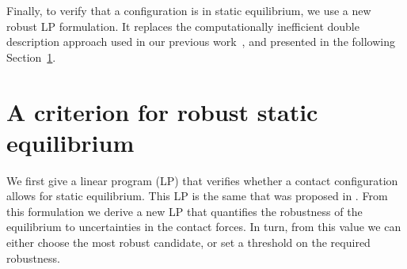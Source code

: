 \documentclass[journal]{IEEEtran}
\providecommand{\DIFaddtex}[1]{#1} %
\providecommand{\DIFaddbegin}{\protect\color{blue}} %
\providecommand{\DIFaddend}{\protect\color{black}} %
\providecommand{\DIFadd}[1]{\texorpdfstring{\DIFaddtex{#1}}{#1}} %
\begin{document}
\DIFaddbegin \DIFadd{Finally, to verify that a configuration is in static equilibrium, we use a new robust LP formulation. It replaces the computationally inefficient double description
approach used in our previous work~\cite{tonneauisrr15}, and presented in the following Section~\ref{sec:Equil}.
}




\DIFaddend %
\DIFaddbegin 

\section{\DIFadd{A criterion for robust static equilibrium}}
\label{sec:Equil}

\DIFadd{We first give a linear program (LP) that verifies whether a contact configuration allows for static equilibrium. This LP is the same that was proposed in  \citep{Prete2016}.
From this formulation we derive a new LP that quantifies the robustness of the equilibrium to uncertainties in the contact forces.
In turn, from this value we can either choose the most robust candidate, or set a threshold on the required robustness. 
}
\end{document}
